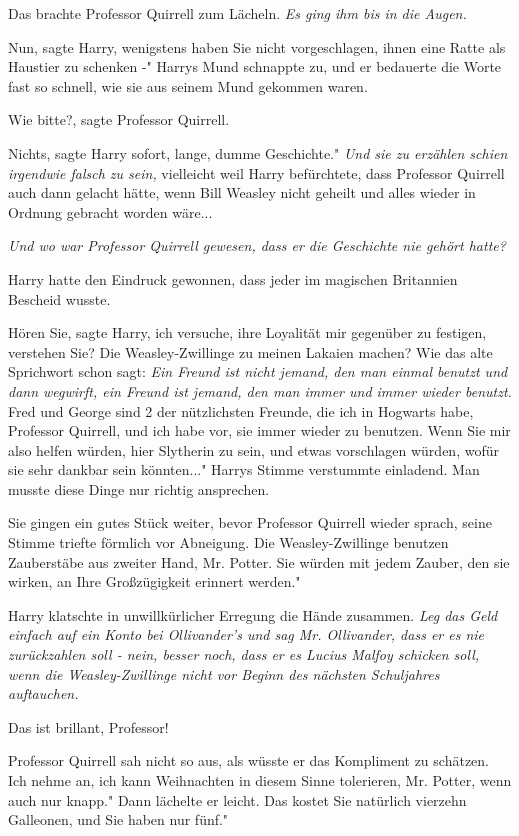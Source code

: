Das brachte Professor Quirrell zum Lächeln.\emph{ Es ging ihm bis in die Augen.}

\glqq Nun\grqq{}, sagte Harry, \glqq wenigstens haben Sie nicht vorgeschlagen,
ihnen eine Ratte als Haustier zu schenken -" Harrys Mund schnappte zu, und er
bedauerte die Worte fast so schnell, wie sie aus seinem Mund gekommen waren.

\glqq Wie bitte?\grqq{}, sagte Professor Quirrell.

\glqq Nichts\grqq{}, sagte Harry sofort, \glqq lange, dumme Geschichte."
\emph{Und sie zu erzählen schien irgendwie falsch zu sein, }vielleicht weil
Harry befürchtete, dass Professor Quirrell auch dann gelacht hätte, wenn Bill
Weasley nicht geheilt und alles wieder in Ordnung gebracht worden wäre...

\emph{Und wo war Professor Quirrell gewesen, dass er die Geschichte nie gehört hatte?}

Harry hatte den Eindruck gewonnen, dass jeder im magischen Britannien Bescheid
wusste.

\glqq Hören Sie\grqq{}, sagte Harry, \glqq ich versuche, ihre Loyalität mir
gegenüber zu festigen, verstehen Sie? Die Weasley-Zwillinge zu meinen Lakaien
machen? Wie das alte Sprichwort schon sagt: \emph{Ein Freund ist nicht jemand,
den man einmal benutzt und dann wegwirft, ein Freund ist jemand, den man immer
und immer wieder benutzt.} Fred und George sind 2 der nützlichsten Freunde, die
ich in Hogwarts habe, Professor Quirrell, und ich habe vor, sie immer wieder zu
benutzen. Wenn Sie mir also helfen würden, hier Slytherin zu sein, und etwas
vorschlagen würden, wofür sie sehr dankbar sein könnten..." Harrys Stimme
verstummte einladend. Man musste diese Dinge nur richtig ansprechen.

Sie gingen ein gutes Stück weiter, bevor Professor Quirrell wieder sprach, seine
Stimme triefte förmlich vor Abneigung. \glqq Die Weasley-Zwillinge benutzen
Zauberstäbe aus zweiter Hand, Mr. Potter. Sie würden mit jedem Zauber, den sie
wirken, an Ihre Großzügigkeit erinnert werden."

Harry klatschte in unwillkürlicher Erregung die Hände zusammen.
\emph{ Leg das Geld einfach auf ein Konto bei Ollivander's und sag Mr. Ollivander, dass er es nie zurückzahlen soll - nein, besser noch, dass er es Lucius Malfoy schicken soll, wenn die Weasley-Zwillinge nicht vor Beginn des nächsten Schuljahres auftauchen.}

\glqq Das ist brillant, Professor!\grqq{}

Professor Quirrell sah nicht so aus, als wüsste er das Kompliment zu schätzen.
\glqq Ich nehme an, ich kann Weihnachten in diesem Sinne tolerieren, Mr. Potter,
wenn auch nur knapp." Dann lächelte er leicht. \glqq Das kostet Sie natürlich
vierzehn Galleonen, und Sie haben nur fünf."


